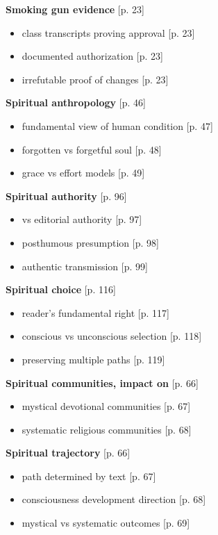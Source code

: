 \documentclass[11pt,twoside]{book}
\begin{document}
\textbf{\textbf{Smoking gun evidence}} {[}p. 23]
\begin{itemize}
\item class transcripts proving approval [p. 23]
\item documented authorization [p. 23]
\item irrefutable proof of changes [p. 23]
\end{itemize}

\textbf{\textbf{Spiritual anthropology}} {[}p. 46]
\begin{itemize}
\item fundamental view of human condition [p. 47]
\item forgotten vs forgetful soul [p. 48]
\item grace vs effort models [p. 49]
\end{itemize}

\textbf{\textbf{Spiritual authority}} {[}p. 96]
\begin{itemize}
\item vs editorial authority [p. 97]
\item posthumous presumption [p. 98]
\item authentic transmission [p. 99]
\end{itemize}

\textbf{\textbf{Spiritual choice}} {[}p. 116]
\begin{itemize}
\item reader's fundamental right [p. 117]
\item conscious vs unconscious selection [p. 118]
\item preserving multiple paths [p. 119]
\end{itemize}

\textbf{\textbf{Spiritual communities, impact on}} {[}p. 66]
\begin{itemize}
\item mystical devotional communities [p. 67]
\item systematic religious communities [p. 68]
\end{itemize}

\textbf{\textbf{Spiritual trajectory}} {[}p. 66]
\begin{itemize}
\item path determined by text [p. 67]
\item consciousness development direction [p. 68]
\item mystical vs systematic outcomes [p. 69]
\end{itemize}
\end{document}
